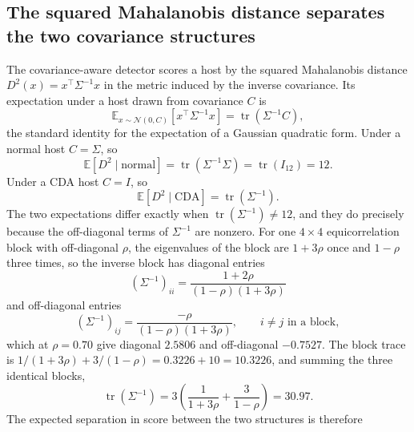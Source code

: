 \documentclass[journal]{IEEEtran}
\begin{document}
\subsection{The squared Mahalanobis distance separates the two covariance structures}
The covariance-aware detector scores a host by the squared Mahalanobis distance
$D^2(x) = x^{\top} \Sigma^{-1} x$ in the metric induced by the inverse covariance. Its expectation
under a host drawn from covariance $C$ is
\begin{equation}
\label{eq:maha_expect}
\mathbb{E}_{x \sim \mathcal{N}(0, C)}\!\left[x^{\top} \Sigma^{-1} x\right]
 = \operatorname{tr}\!\left(\Sigma^{-1} C\right),
\end{equation}
the standard identity for the expectation of a Gaussian quadratic form. Under a normal host $C = \Sigma$,
so
\begin{equation}
\label{eq:maha_normal}
\mathbb{E}\!\left[D^2 \mid \text{normal}\right] = \operatorname{tr}(\Sigma^{-1}\Sigma)
 = \operatorname{tr}(I_{12}) = 12.
\end{equation}
Under a CDA host $C = I$, so
\begin{equation}
\label{eq:maha_cda}
\mathbb{E}\!\left[D^2 \mid \text{CDA}\right] = \operatorname{tr}(\Sigma^{-1}).
\end{equation}
The two expectations differ exactly when $\operatorname{tr}(\Sigma^{-1}) \neq 12$, and they do
precisely because the off-diagonal terms of $\Sigma^{-1}$ are nonzero. For one $4 \times 4$
equicorrelation block with off-diagonal $\rho$, the eigenvalues of the block are $1 + 3\rho$ once and
$1 - \rho$ three times, so the inverse block has diagonal entries
\begin{equation}
\label{eq:inv_diag}
(\Sigma^{-1})_{ii} = \frac{1 + 2\rho}{(1 - \rho)(1 + 3\rho)}
\end{equation}
and off-diagonal entries
\begin{equation}
\label{eq:inv_off}
(\Sigma^{-1})_{ij} = \frac{-\rho}{(1 - \rho)(1 + 3\rho)}, \qquad i \neq j \text{ in a block},
\end{equation}
which at $\rho = 0.70$ give diagonal $2.5806$ and off-diagonal $-0.7527$. The block trace is
$1/(1 + 3\rho) + 3/(1 - \rho) = 0.3226 + 10 = 10.3226$, and summing the three identical blocks,
\begin{equation}
\label{eq:tr_inv}
\operatorname{tr}(\Sigma^{-1}) = 3\left(\frac{1}{1 + 3\rho} + \frac{3}{1 - \rho}\right) = 30.97.
\end{equation}
The expected separation in score between the two structures is therefore
\end{document}
